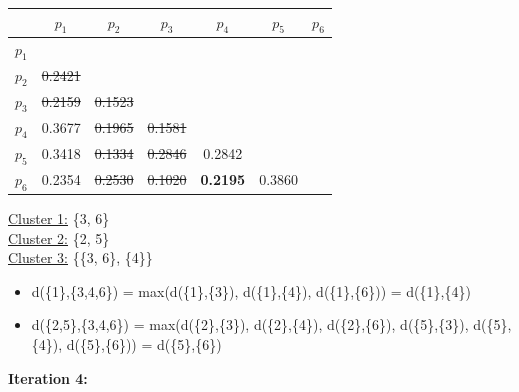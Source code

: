 \documentclass[11pt]{article}
\begin{document}
	\begin{center}
    	\begin{adjustbox}{max width=\textwidth}
		\begin{tabular}{ | c | c | c | c | c | c | c |}
	  	 	\hline

	  	 	& \textbf{$p_1$} & \textbf{$p_2$} & \textbf{$p_3$} & \textbf{$p_4$} & \textbf{$p_5$} & \textbf{$p_6$}\\
	  	 	\hline
	  	 	
	  	 	\textbf{$p_1$} &  &  &  &  &  &\\
	  	 	\hline
	  	 	
	  	 	\textbf{$p_2$} & \st{0.2421} &  &  &  &  &  \\
	  	 	\hline
	  	 	
	  	 	\textbf{$p_3$} & \st{0.2159} & \st{0.1523} &  &  &  & \\
	  	 	\hline
	  	 	
	  	 	\textbf{$p_4$} & 0.3677 & \st{0.1965} & \st{0.1581} &  &  & \\
	  	 	\hline
	  	 	
	  	 	\textbf{$p_5$} & 0.3418 & \st{0.1334} & \st{0.2846} & 0.2842 &  & \\
	  	 	\hline	
	  	 	
	  	 	\textbf{$p_6$} & 0.2354 & \st{0.2530} & \st{0.1020} & \textbf{0.2195} & 0.3860 & \\
	  	 	\hline			
    		\end{tabular}
    	\end{adjustbox}
	\end{center}
	
	\underline{Cluster 1:} \{3, 6\} \\
	\underline{Cluster 2:} \{2, 5\} \\
	\underline{Cluster 3:} \{\{3, 6\}, \{4\}\}
	
	\begin{itemize}
		\item d(\{1\},\{3,4,6\}) = max(d(\{1\},\{3\}), d(\{1\},\{4\}), d(\{1\},\{6\})) = d(\{1\},\{4\})
		\item d(\{2,5\},\{3,4,6\}) = max(d(\{2\},\{3\}), d(\{2\},\{4\}), d(\{2\},\{6\}), d(\{5\},\{3\}), d(\{5\},\{4\}), d(\{5\},\{6\})) = d(\{5\},\{6\})
	\end{itemize}
	
	
	\textbf{Iteration 4:}
	
\end{document}
